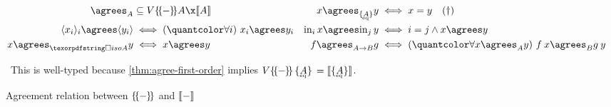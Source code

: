 \begin{figure*}\centering
  \begin{align*}
    {\agrees_A} &\subseteq \vals{\incdens{A}} \x \den{A} &
    x \agrees_{\tseteq A} y &\iff x = y \quad(\text{\textdagger})\\
    \tuple{x_i}_i \agrees \tuple{y_i} &\iff \fa{i} x_i \agrees y_i &
    \inj i x \agrees \inj j y &\iff i = j \wedge x \agrees y\\
    x \agrees_{\isof A} y &\iff x \agrees y &
    f \agrees_{A \to B} g &\iff \fa{x \agrees_A y} f\<x \agrees_B g\<y
  \end{align*}

  \small \textdagger\ This is well-typed because \cref{thm:agree-first-order}
  implies $\vals{\incdens{\,\tseteq{A}\,}} = \den{\tseteq{A}}$.

  \caption{Agreement relation between $\{\kern-.18em\{\kern-.05em{-}\kern-.05em\}\kern -.18em\}$ and $\llbracket{-}\rrbracket$}
  \label{fig:agrees}
\end{figure*}
